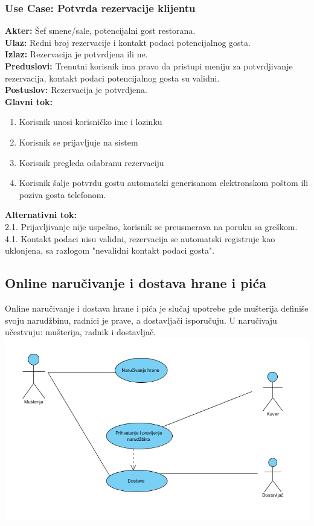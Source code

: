 \documentclass{article}
\begin{document}
\subsubsection{\textbf{Use Case}: Potvrda rezervacije klijentu}
\textbf{Akter:} Šef smene/sale, potencijalni gost restorana.\\
\textbf{Ulaz:} Redni broj rezervacije i kontakt podaci potencijalnog gosta.\\
\textbf{Izlaz:} Rezervacija je potvrdjena ili ne.\\
\textbf{Preduslovi:} Trenutni korisnik ima pravo da pristupi meniju za potvrdjivanje rezervacija, kontakt podaci potencijalnog gosta su validni.\\
\textbf{Postuslov:} Rezervacija je potvrdjena.\\
\textbf{Glavni tok:}
\begin{enumerate}
\item Korisnik unosi korisničko ime i lozinku
\item Korisnik se prijavljuje na sistem
\item Korisnik pregleda odabranu rezervaciju
\item Korisnik šalje potvrdu gostu automatski generisanom elektronskom poštom ili poziva gosta telefonom.\\
\end{enumerate}
\textbf{Alternativni tok:}\\
       2.1. Prijavljivanje nije uspešno, korisnik se preusmerava na poruku sa greškom.\\
       4.1. Kontakt podaci nisu validni, rezervacija se automatski registruje kao uklonjena, sa razlogom "nevalidni kontakt podaci gosta".\\


\subsection{Online naručivanje i dostava hrane i pića}
Online naručivanje i dostava hrane i pića je slučaj upotrebe gde mušterija definiše svoju narudžbinu, radnici je prave, a dostavljači isporučuju. U naručivaju učestvuju: mušterija, radnik i dostavljač.
\\
\includegraphics[width=\linewidth]{SU_6_dostava.png}
\end{document}
